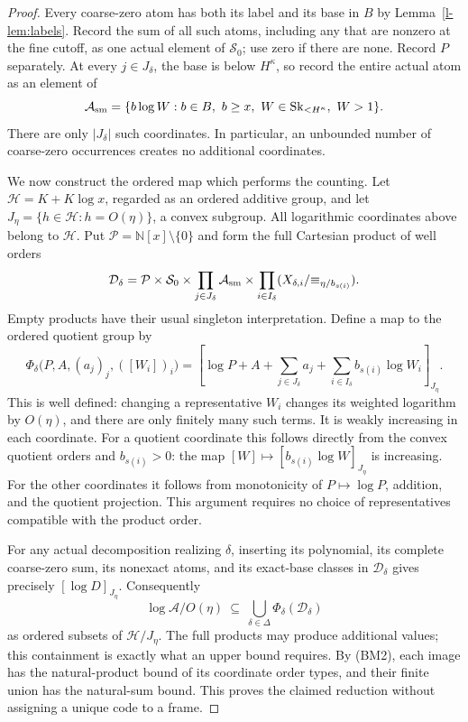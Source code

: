 \documentclass[11pt]{article}
\theoremstyle{definition}
\theoremstyle{remark}
\newcommand{\Sk}{\operatorname{Sk}}
\newcommand{\N}{\mathbb N}
\newcommand{\calA}{\mathcal A}
\newcommand{\Bsmall}{\mathcal S_0}
\numberwithin{equation}{section}
\begin{document}
\begin{proof}
Every coarse-zero atom has both its label and its base in $B$ by
Lemma~\ref{l-lem:labels}.  Record the sum of all such atoms,
including any that are nonzero at the fine cutoff, as one actual
element of $\Bsmall$; use zero if there are none.  Record $P$
separately.  At every $j\in J_\delta$, the base is below
$H^\kappa$, so record the entire actual atom as an element of
\[
 \mathcal A_{\rm sm}=
 \{b\log W:b\in B,\ b\ge x,\ W\in\Sk_{<H^\kappa},\ W>1\}.
\]
There are only $|J_\delta|$ such coordinates.  In particular, an
unbounded number of coarse-zero occurrences creates no additional
coordinates.

We now construct the ordered map which performs the counting.
Let $\mathcal H=K+K\log x$, regarded as an ordered additive group,
and let $J_\eta=\{h\in\mathcal H:h=O(\eta)\}$, a convex
subgroup.  All logarithmic coordinates above belong to
$\mathcal H$.  Put $\mathcal P=\N[x]\setminus\{0\}$ and form
the full Cartesian product of well orders
\[
 \mathcal D_\delta=
 \mathcal P\times\Bsmall\times
 \prod_{j\in J_\delta}\mathcal A_{\rm sm}\times
 \prod_{i\in I_\delta}
       (X_{\delta,i}/{\equiv_{\eta/b_{s(i)}}}).
\]
Empty products have their usual singleton interpretation.
Define a map to the ordered quotient group by
\[
 \Phi_\delta\bigl(P,A,(a_j)_j,([W_i])_i\bigr)
 =\left[\log P+A+\sum_{j\in J_\delta}a_j
                   +\sum_{i\in I_\delta}b_{s(i)}\log W_i\right]_{J_\eta}.
\]
This is well defined: changing a representative $W_i$ changes its
weighted logarithm by $O(\eta)$, and there are only finitely many
such terms.  It is weakly increasing in each coordinate.
For a quotient coordinate this follows directly from the convex
quotient orders and $b_{s(i)}>0$: the map
$[W]\mapsto[b_{s(i)}\log W]_{J_\eta}$ is increasing.
For the other coordinates it follows from monotonicity of
$P\mapsto\log P$, addition, and the quotient projection.
This argument requires no choice of representatives compatible
with the product order.

For any actual decomposition realizing $\delta$, inserting its
polynomial, its complete coarse-zero sum, its nonexact atoms, and
its exact-base classes in $\mathcal D_\delta$ gives precisely
$[\log D]_{J_\eta}$.  Consequently
\[
 \log\calA/O(\eta)
 \ \subseteq\ \bigcup_{\delta\in\Delta}
                         \Phi_\delta(\mathcal D_\delta)
\]
as ordered subsets of $\mathcal H/J_\eta$.
The full products may produce additional values; this containment
is exactly what an upper bound requires.  By (BM2), each image
has the natural-product bound of its coordinate order types, and
their finite union has the natural-sum bound.  This proves the
claimed reduction without assigning a unique code to a frame.


\end{proof}
\end{document}
